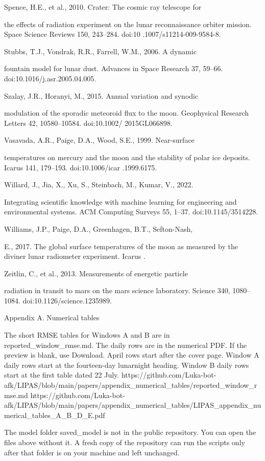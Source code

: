 Spence, H.E., et al., 2010. Crater: The cosmic ray telescope for

the effects of radiation experiment on the lunar reconnaissance orbiter mission. Space Science Reviews 150, 243--284. doi:10 .1007/s11214-009-9584-8.

Stubbs, T.J., Vondrak, R.R., Farrell, W.M., 2006. A dynamic

fountain model for lunar dust. Advances in Space Research 37, 59--66. doi:10.1016/j.asr.2005.04.005.

Szalay, J.R., Horanyi, M., 2015. Annual variation and synodic

modulation of the sporadic meteoroid flux to the moon. Geophysical Research Letters 42, 10580--10584. doi:10.1002/ 2015GL066898.

Vasavada, A.R., Paige, D.A., Wood, S.E., 1999. Near-surface

temperatures on mercury and the moon and the stability of polar ice deposits. Icarus 141, 179--193. doi:10.1006/icar .1999.6175.

Willard, J., Jia, X., Xu, S., Steinbach, M., Kumar, V., 2022.

Integrating scientific knowledge with machine learning for engineering and environmental systems. ACM Computing Surveys 55, 1--37. doi:10.1145/3514228.

Williams, J.P., Paige, D.A., Greenhagen, B.T., Sefton-Nash,

E., 2017. The global surface temperatures of the moon as measured by the diviner lunar radiometer experiment. Icarus .

Zeitlin, C., et al., 2013. Measurements of energetic particle

radiation in transit to mars on the mars science laboratory. Science 340, 1080--1084. doi:10.1126/science.1235989.

Appendix A. Numerical tables

The short RMSE tables for Windows A and B are in reported\_window\_rmse.md. The daily rows are in the numerical PDF. If the preview is blank, use Download. April rows start after the cover page. Window A daily rows start at the fourteen-day lunarnight heading. Window B daily rows start at the first table dated 22 July. https://github.com/Luka-bot-afk/LIPAS/blob/main/papers/appendix\_numerical\_tables/reported\_window\_rmse.md https://github.com/Luka-bot-afk/LIPAS/blob/main/papers/appendix\_numerical\_tables/LIPAS\_appendix\_numerical\_tables\_A\_B\_D\_E.pdf

The model folder saved\_model is not in the public repository. You can open the files above without it. A fresh copy of the repository can run the scripts only after that folder is on your machine and left unchanged.

